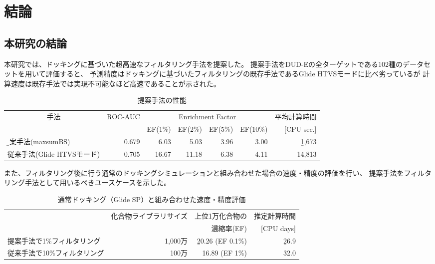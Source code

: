 \chapter{結論}
\section{本研究の結論}\label{sec:conclusion}
本研究では、ドッキングに基づいた超高速なフィルタリング手法を提案した。
提案手法をDUD-Eの全ターゲットである102種のデータセットを用いて評価すると、
予測精度はドッキングに基づいたフィルタリングの既存手法であるGlide HTVSモードに比べ劣っているが
計算速度は既存手法では実現不可能なほど高速であることが示された。
\begin{table}[h] \centering
	\caption{提案手法の性能}
	\label{table:conclusion_1}
	\begin{tabular}{l|rrrrrr}
	\hline
	\multicolumn{1}{c|}{\multirow{2}{*}{手法}}	&\multirow{2}{*}{ROC-AUC}	&\multicolumn{4}{c}{Enrichment Factor}	&平均計算時間	\\
										&						&EF(1\%)	&EF(2\%)	&EF(5\%)	&EF(10\%)	&[CPU sec.]		\\ \hline
	\b{提案手法(maxsumBS)}				&0.679					&6.03	&5.03	&3.96	&3.00		&\b{1,673}		\\
	従来手法(Glide HTVSモード)				&0.705				&16.67	&11.18	&6.38	&4.11		&14,813			\\ \hline
	\end{tabular}
\end{table}



また、フィルタリング後に行う通常のドッキングシミュレーションと組み合わせた場合の速度・精度の評価を行い、
提案手法をフィルタリング手法として用いるべきユースケースを示した。
\begin{table}[htbp] \centering
	\caption{通常ドッキング（Glide SP）と組み合わせた速度・精度評価}
	\label{table:conclusion_2}
	\begin{tabular}{l|rrr}
	\hline
												&\multirow{2}{*}{化合物ライブラリサイズ}	&上位1万化合物の		&推定計算時間	\\
												&														&濃縮率(EF)				&[CPU days]		\\ \hline
	提案手法で1\%フィルタリング		&1,000万											&\b{20.26 (EF 0.1\%)}		&\b{26.9}				\\
	従来手法で10\%フィルタリング	&100万												&16.89 (EF 1\%)			&32.0				\\ \hline
	\end{tabular}
\end{table}


